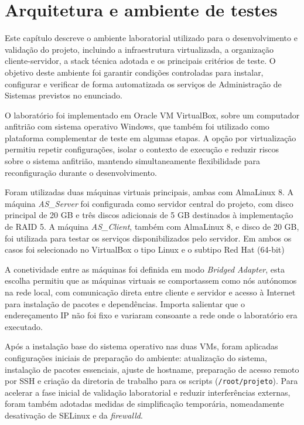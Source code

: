 \chapter{Arquitetura e ambiente de testes}
\label{cap2}

Este capítulo descreve o ambiente laboratorial utilizado para o desenvolvimento e validação do projeto, incluindo a infraestrutura virtualizada, a organização cliente-servidor, a stack técnica adotada e os principais critérios de teste. O objetivo deste ambiente foi garantir condições controladas para instalar, configurar e verificar de forma automatizada os serviços de Administração de Sistemas previstos no enunciado.

O laboratório foi implementado em Oracle VM VirtualBox, sobre um computador anfitrião com sistema operativo Windows, que também foi utilizado como plataforma complementar de teste em algumas etapas. A opção por virtualização permitiu repetir configurações, isolar o contexto de execução e reduzir riscos sobre o sistema anfitrião, mantendo simultaneamente flexibilidade para reconfiguração durante o desenvolvimento.

Foram utilizadas duas máquinas virtuais principais, ambas com AlmaLinux 8. A máquina \textit{AS\_Server} foi configurada como servidor central do projeto, com disco principal de 20 GB e três discos adicionais de 5 GB destinados à implementação de RAID 5. A máquina \textit{AS\_Client}, também com AlmaLinux 8, e disco de 20 GB, foi utilizada para testar os serviços disponibilizados pelo servidor. Em ambos os casos foi selecionado no VirtualBox o tipo Linux e o subtipo Red Hat (64-bit)

A conetividade entre as máquinas foi definida em modo \textit{Bridged Adapter}, esta escolha permitiu que as máquinas virtuais se comportassem como nós autónomos na rede local, com comunicação direta entre cliente e servidor e acesso à Internet para instalação de pacotes e dependências. Importa salientar que o endereçamento IP não foi fixo e variaram consoante a rede onde o laboratório era executado.

Após a instalação base do sistema operativo nas duas VMs, foram aplicadas configurações iniciais de preparação do ambiente: atualização do sistema, instalação de pacotes essenciais, ajuste de hostname, preparação de acesso remoto por SSH e criação da diretoria de trabalho para os scripts (\texttt{/root/projeto}). Para acelerar a fase inicial de validação laboratorial e reduzir interferências externas, foram também adotadas medidas de simplificação temporária, nomeadamente desativação de SELinux e da \textit{firewalld}.

